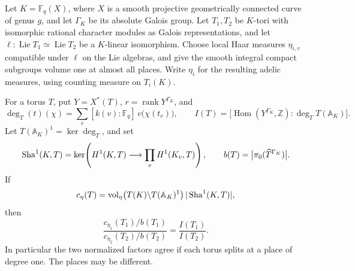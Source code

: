 \begin{lemma}
\label{lem:global-torus-factor}
Let $K=\mathbb F_q(X)$, where $X$ is a smooth projective geometrically
connected curve of genus $g$, and let $\Gamma_K$ be its absolute Galois
group.  Let $T_1,T_2$ be $K$-tori with isomorphic
rational character modules as Galois representations, and let
$\ell:\operatorname{Lie}T_1\simeq\operatorname{Lie}T_2$ be a $K$-linear
isomorphism.  Choose local Haar measures $\eta_{i,v}$ compatible under
$\ell$ on the Lie algebras, and give the smooth integral compact
subgroups volume one at almost all places.  Write $\eta_i$ for the
resulting adelic measures, using counting measure on $T_i(K)$.

For a torus $T$, put $Y=X^*(T)$, $r=\operatorname{rank}Y^{\Gamma_K}$,
and
\[
 \deg_T(t)(\chi)=\sum_v [k(v):\mathbb F_q]\,
                         v\bigl(\chi(t_v)\bigr),\qquad
 I(T)=\bigl[\operatorname{Hom}(Y^{\Gamma_K},\mathbb Z):
                       \deg_T T(\mathbb A_K)\bigr].
\]
Let $T(\mathbb A_K)^1=\ker\deg_T$, and set
\[
 \operatorname{Sha}^1(K,T)=\ker\!\left(H^1(K,T)\longrightarrow
                                      \prod_v H^1(K_v,T)\right),
 \qquad b(T)=\bigl|\pi_0(\widehat T^{\Gamma_K})\bigr|.
\]
If
\[
 c_{\eta}(T)=
  \operatorname{vol}_{\eta}\bigl(T(K)\backslash T(\mathbb A_K)^1\bigr)
  \,|\operatorname{Sha}^1(K,T)|,
\]
then
\begin{equation}
 \label{eq:torus-factor-degree-index}
 \frac{c_{\eta_1}(T_1)/b(T_1)}{c_{\eta_2}(T_2)/b(T_2)}
       =\frac{I(T_1)}{I(T_2)}.
\end{equation}
In particular the two normalized factors agree if each torus splits at
a place of degree one.  The places may be different.
\end{lemma}

